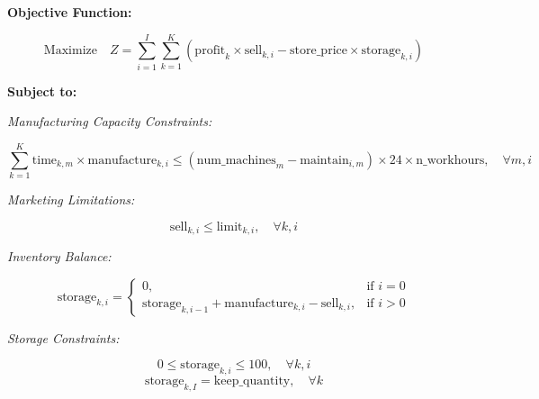 \documentclass{article}
\begin{document}
\textbf{Objective Function:}

\[
\text{Maximize} \quad Z = \sum_{i=1}^{I} \sum_{k=1}^{K} (\text{profit}_k \times \text{sell}_{k, i} - \text{store\_price} \times \text{storage}_{k, i})
\]

\textbf{Subject to:}

\textit{Manufacturing Capacity Constraints:}

\[
\sum_{k=1}^{K} \text{time}_{k, m} \times \text{manufacture}_{k, i} \leq (\text{num\_machines}_m - \text{maintain}_{i, m}) \times 24 \times \text{n\_workhours}, \quad \forall m, i
\]

\textit{Marketing Limitations:}

\[
\text{sell}_{k, i} \leq \text{limit}_{k, i}, \quad \forall k, i
\]

\textit{Inventory Balance:}

\[
\text{storage}_{k, i} = \begin{cases} 
0, & \text{if } i = 0 \\
\text{storage}_{k, i-1} + \text{manufacture}_{k, i} - \text{sell}_{k, i}, & \text{if } i > 0
\end{cases}
\]

\textit{Storage Constraints:}

\[
0 \leq \text{storage}_{k, i} \leq 100, \quad \forall k, i
\]
\[
\text{storage}_{k, I} = \text{keep\_quantity}, \quad \forall k
\]
\end{document}
